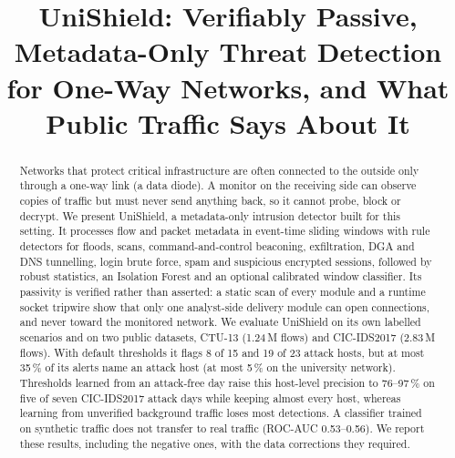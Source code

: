 \documentclass[conference]{IEEEtran}
\begin{document}
\title{UniShield: Verifiably Passive, Metadata-Only Threat Detection for One-Way Networks, and What Public Traffic Says About It}

\author{
\and
{}
}

\maketitle

\begin{abstract}
Networks that protect critical infrastructure are often connected to the outside only through a one-way link (a data diode). A monitor on the receiving side can observe copies of traffic but must never send anything back, so it cannot probe, block or decrypt. We present UniShield, a metadata-only intrusion detector built for this setting. It processes flow and packet metadata in event-time sliding windows with rule detectors for floods, scans, command-and-control beaconing, exfiltration, DGA and DNS tunnelling, login brute force, spam and suspicious encrypted sessions, followed by robust statistics, an Isolation Forest and an optional calibrated window classifier. Its passivity is verified rather than asserted: a static scan of every module and a runtime socket tripwire show that only one analyst-side delivery module can open connections, and never toward the monitored network. We evaluate UniShield on its own labelled scenarios and on two public datasets, CTU-13 (1.24\,M flows) and CIC-IDS2017 (2.83\,M flows). With default thresholds it flags 8 of 15 and 19 of 23 attack hosts, but at most 35\,\% of its alerts name an attack host (at most 5\,\% on the university network). Thresholds learned from an attack-free day raise this host-level precision to 76--97\,\% on five of seven CIC-IDS2017 attack days while keeping almost every host, whereas learning from unverified background traffic loses most detections. A classifier trained on synthetic traffic does not transfer to real traffic (ROC-AUC 0.53--0.56). We report these results, including the negative ones, with the data corrections they required.
\end{abstract}
\end{document}
